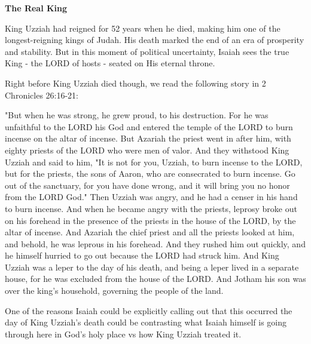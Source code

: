 \documentclass[11pt]{article}
\begin{document}
{\vspace{1em}}

{\large\bfseries The Real King}
{\vspace{1em}}

King Uzziah had reigned for 52 years when he died, making him one of the longest-reigning kings of Judah. His death marked the end of an era of prosperity and stability. But in this moment of political uncertainty, Isaiah sees the true King - the LORD of hosts - seated on His eternal throne.

{\vspace{1em}}
Right before King Uzziah died though, we read the following story in 2 Chronicles 26:16-21:

{\vspace{1em}}


\begin{versesection}{2em}

 "But when he was strong, he grew proud, to his destruction. For he was unfaithful to the LORD his God and entered the temple of the LORD to burn incense on the altar of incense.  But Azariah the priest went in after him, with eighty priests of the LORD who were men of valor.  And they withstood King Uzziah and said to him, "It is not for you, Uzziah, to burn incense to the LORD, but for the priests, the sons of Aaron, who are consecrated to burn incense. Go out of the sanctuary, for you have done wrong, and it will bring you no honor from the LORD God."  Then Uzziah was angry, and he had a censer in his hand to burn incense. And when he became angry with the priests, leprosy broke out on his forehead in the presence of the priests in the house of the LORD, by the altar of incense.  And Azariah the chief priest and all the priests looked at him, and behold, he was leprous in his forehead. And they rushed him out quickly, and he himself hurried to go out because the LORD had struck him.  And King Uzziah was a leper to the day of his death, and being a leper lived in a separate house, for he was excluded from the house of the LORD. And Jotham his son was over the king's household, governing the people of the land.

\end{versesection}

{\vspace{1em}}

One of the reasons Isaiah could be explicitly calling out that this occurred the day of King Uzziah's death could be contrasting what Isaiah himself is going through here in God's holy place vs how King Uzziah treated it.
\end{document}
